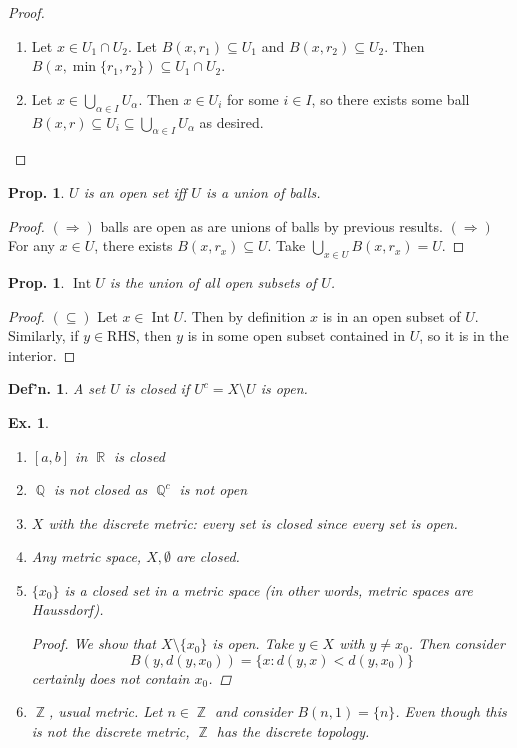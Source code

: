 \documentclass[12pt, a4paper]{book}
\DeclareMathOperator{\Q}{\mathbb{Q}}
\DeclareMathOperator{\Z}{\mathbb{Z}}
\DeclareMathOperator{\R}{\mathbb{R}}
\DeclareMathOperator{\Int}{Int}
\newtheorem{definition}[theorem]{Def'n.}
\newtheorem{proposition}[theorem]{Prop.}
\newtheorem{example}[theorem]{Ex.}
\theoremstyle{nonumberplain}
\newtheorem{proof}{Proof}
\begin{document}
\begin{proof}
    \begin{enumerate}
        \item Let $x\in U_1\cap U_2$. Let $B(x,r_1)\subseteq U_1$ and $B(x,r_2)\subseteq U_2$. Then $B(x,\min\{r_1,r_2\})\subseteq U_1\cap U_2$.
        \item Let $x\in\bigcup_{\alpha\in I}U_\alpha$. Then $x\in U_i$ for some $i\in I$, so there exists some ball
            $B(x,r)\subseteq U_i\subseteq\bigcup_{\alpha\in I}U_\alpha$ as desired.
    \end{enumerate}
\end{proof}
\begin{proposition}
    $U$ is an open set iff $U$ is a union of balls.
\end{proposition}
\begin{proof}
    $(\Rightarrow)$ balls are open as are unions of balls by previous results.
    $(\Rightarrow)$ For any $x\in U$, there exists $B(x,r_x)\subseteq U$. Take $\bigcup_{x\in U}B(x,r_x)=U$.
\end{proof}
\begin{proposition}
    $\Int U$ is the union of all open subsets of $U$.
\end{proposition}
\begin{proof}
    $(\subseteq)$ Let $x\in\Int U$. Then by definition $x$ is in an open subset of $U$. Similarly, if $y\in\text{RHS}$,
    then $y$ is in some open subset contained in $U$, so it is in the interior.
\end{proof}
\begin{definition}
    A set $U$ is closed if $U^c=X\setminus U$ is open.
\end{definition}
\begin{example}
    \begin{enumerate}
        \item $[a,b]$ in $\R$ is closed
        \item $\Q$ is not closed as $\Q^c$ is not open
        \item $X$ with the discrete metric: every set is closed since every set is open.
        \item Any metric space, $X,\emptyset$ are closed.
        \item $\{x_0\}$ is a closed set in a metric space (in other words, metric spaces are Haussdorf).
            \begin{proof}
                We show that $X\setminus\{x_0\}$ is open. Take $y\in X$ with $y\neq x_0$. Then consider
                \[B(y,d(y,x_0))=\{x:d(y,x)<d(y,x_0)\}\]
                certainly does not contain $x_0$.
            \end{proof}
        \item $\Z$, usual metric. Let $n\in\Z$ and consider $B(n,1)=\{n\}$. Even though this is not the discrete metric,
            $\Z$ has the discrete topology.
    \end{enumerate}
\end{example}
\end{document}
